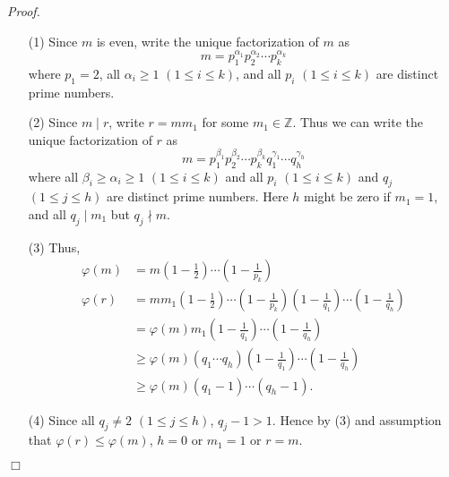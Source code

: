 \documentclass{article}
\begin{document}
\emph{Proof.}
\begin{enumerate}
\item[(1)]
Since $m$ is even,
write the unique factorization of $m$ as
$$m = p_1^{\alpha_1} p_2^{\alpha_2} \cdots p_k^{\alpha_k}$$
where $p_1 = 2$, all $\alpha_i \geq 1$ $(1 \leq i \leq k)$,
and all $p_i$ $(1 \leq i \leq k)$
are distinct prime numbers.
\item[(2)]
Since $m \mid r$, write $r = mm_1$ for some $m_1 \in \mathbb{Z}$.
Thus we can write the unique factorization of $r$ as
$$m = p_1^{\beta_1} p_2^{\beta_2} \cdots p_k^{\beta_k}
q_1^{\gamma_1} \cdots q_h^{\gamma_h}$$
where all $\beta_i \geq \alpha_i \geq 1$ $(1 \leq i \leq k)$
and all $p_i$ $(1 \leq i \leq k)$ and $q_j$ $(1 \leq j \leq h)$
are distinct prime numbers.
Here $h$ might be zero if $m_1 = 1$, and all $q_j \mid m_1$ but $q_j \nmid m$.
\item[(3)]
Thus,
\begin{align*}
\varphi(m)
&= m
    \left( 1 - \frac{1}{2} \right)
    \cdots
    \left( 1 - \frac{1}{p_k} \right) \\
\varphi(r)
&= mm_1
    \left( 1 - \frac{1}{2} \right)
    \cdots
    \left( 1 - \frac{1}{p_k} \right)
    \left( 1 - \frac{1}{q_1} \right)
    \cdots
    \left( 1 - \frac{1}{q_h} \right) \\
&= \varphi(m) m_1
    \left( 1 - \frac{1}{q_1} \right)
    \cdots
    \left( 1 - \frac{1}{q_h} \right) \\
&\geq \varphi(m) (q_1 \cdots q_h)
    \left( 1 - \frac{1}{q_1} \right)
    \cdots
    \left( 1 - \frac{1}{q_h} \right) \\
&\geq \varphi(m)(q_1-1) \cdots (q_h-1).
\end{align*}
\item[(4)]
Since all $q_j \neq 2$ $(1 \leq j \leq h)$,
$q_j - 1 > 1$.
Hence by (3) and assumption that $\varphi(r) \leq \varphi(m)$,
$h = 0$ or $m_1 = 1$ or $r = m$.
\end{enumerate}
$\Box$ \\\\



\end{document}
